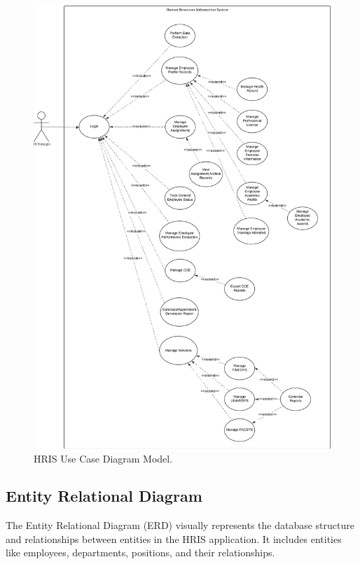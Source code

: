     \begin{figure}[H]
        \centering
        \includegraphics[width=0.9\linewidth]{figures/images/use-case.png}
        \caption{HRIS Use Case Diagram Model.}
        \label{fig:use-case}
    \end{figure}
    
    \subsection{Entity Relational Diagram}
    
    The Entity Relational Diagram (ERD) visually represents the database structure and relationships between entities in the HRIS application. It includes entities like employees, departments, positions, and their relationships.

